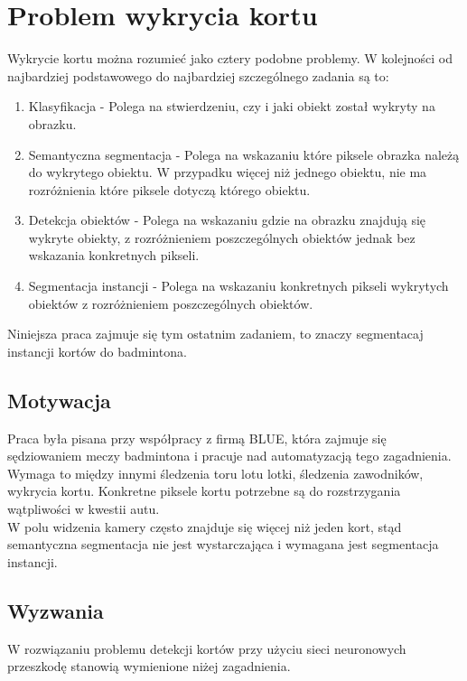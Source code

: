 \chapter{Problem wykrycia kortu}

Wykrycie kortu można rozumieć jako cztery podobne problemy. W kolejności od najbardziej podstawowego do najbardziej szczególnego zadania są to:

\begin{enumerate}
	\item Klasyfikacja - Polega na stwierdzeniu, czy i jaki obiekt został wykryty na obrazku.
	\item Semantyczna segmentacja - Polega na wskazaniu które piksele obrazka należą do wykrytego obiektu. W przypadku więcej niż jednego obiektu, nie ma rozróżnienia które piksele dotyczą którego obiektu.
	\item Detekcja obiektów - Polega na wskazaniu gdzie na obrazku znajdują się wykryte obiekty, z rozróżnieniem poszczególnych obiektów jednak bez wskazania konkretnych pikseli.
	\item Segmentacja instancji - Polega na wskazaniu konkretnych pikseli wykrytych obiektów z rozróżnieniem poszczególnych obiektów.
\end{enumerate}

Niniejsza praca zajmuje się tym ostatnim zadaniem, to znaczy segmentacaj instancji kortów do badmintona.

\section{Motywacja}

Praca była pisana przy współpracy z firmą BLUE, która zajmuje się sędziowaniem meczy badmintona i pracuje nad automatyzacją tego zagadnienia. Wymaga to między innymi śledzenia toru lotu lotki, śledzenia zawodników, wykrycia kortu. Konkretne piksele kortu potrzebne są do rozstrzygania wątpliwości w kwestii autu. \\

W polu widzenia kamery często znajduje się więcej niż jeden kort, stąd semantyczna segmentacja nie jest wystarczająca i wymagana jest segmentacja instancji.

\section{Wyzwania}

W rozwiązaniu problemu detekcji kortów przy użyciu sieci neuronowych przeszkodę stanowią wymienione niżej zagadnienia.

